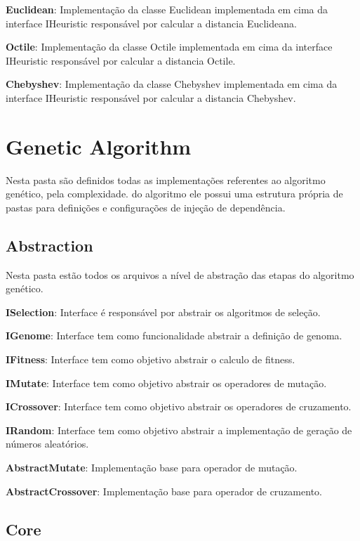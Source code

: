  \textbf{Euclidean}: Implementação da classe Euclidean implementada em cima da interface IHeuristic responsável por calcular a distancia Euclideana.
 
 \textbf{Octile}: Implementação da classe Octile implementada em cima da interface IHeuristic responsável por calcular a distancia Octile.
 
 \textbf{Chebyshev}: Implementação da classe Chebyshev implementada em cima da interface IHeuristic responsável por calcular a distancia Chebyshev.
 
 \section{Genetic Algorithm}
 
 Nesta pasta são definidos todas as implementações referentes ao algoritmo genético, pela complexidade.
 do algoritmo ele possui uma estrutura própria de pastas para definições e configurações de injeção de dependência.
 
 \subsection{Abstraction}
 
 Nesta pasta estão todos os arquivos a nível de abstração das etapas do algoritmo genético.
 
 \textbf{ISelection}: Interface é responsável por abstrair os algoritmos de seleção.
 
 \textbf{IGenome}: Interface tem como funcionalidade abstrair a definição de genoma.
 
 \textbf{IFitness}: Interface tem como objetivo abstrair o calculo de fitness.
 
 \textbf{IMutate}: Interface tem como objetivo abstrair os operadores de mutação.
 
 \textbf{ICrossover}:  Interface tem como objetivo abstrair os operadores de cruzamento.
 
 \textbf{IRandom}: Interface tem como objetivo abstrair a implementação de geração de números aleatórios.
 
 \textbf{AbstractMutate}: Implementação base para operador de mutação.
 
 \textbf{AbstractCrossover}: Implementação base para operador de cruzamento.
 
 \subsection{Core}
 
